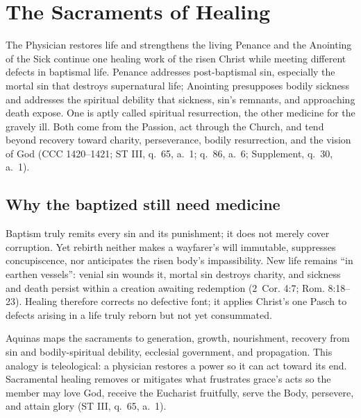 \section{The Sacraments of Healing}

\begin{massbox}{The Physician restores life and strengthens the living}
Penance and the Anointing of the Sick continue one healing work of the risen Christ while meeting different defects in baptismal life. Penance addresses post-baptismal sin, especially the mortal sin that destroys supernatural life; Anointing presupposes bodily sickness and addresses the spiritual debility that sickness, sin's remnants, and approaching death expose. One is aptly called spiritual resurrection, the other medicine for the gravely ill. Both come from the Passion, act through the Church, and tend beyond recovery toward charity, perseverance, bodily resurrection, and the vision of God (CCC 1420--1421; ST III, q.~65, a.~1; q.~86, a.~6; Supplement, q.~30, a.~1).
\end{massbox}

\subsection{Why the baptized still need medicine}

Baptism truly remits every sin and its punishment; it does not merely cover corruption. Yet rebirth neither makes a wayfarer's will immutable, suppresses concupiscence, nor anticipates the risen body's impassibility. New life remains ``in earthen vessels'': venial sin wounds it, mortal sin destroys charity, and sickness and death persist within a creation awaiting redemption (2~Cor. 4:7; Rom. 8:18--23). Healing therefore corrects no defective font; it applies Christ's one Pasch to defects arising in a life truly reborn but not yet consummated.

Aquinas maps the sacraments to generation, growth, nourishment, recovery from sin and bodily-spiritual debility, ecclesial government, and propagation. This analogy is teleological: a physician restores a power so it can act toward its end. Sacramental healing removes or mitigates what frustrates grace's acts so the member may love God, receive the Eucharist fruitfully, serve the Body, persevere, and attain glory (ST III, q.~65, a.~1).

